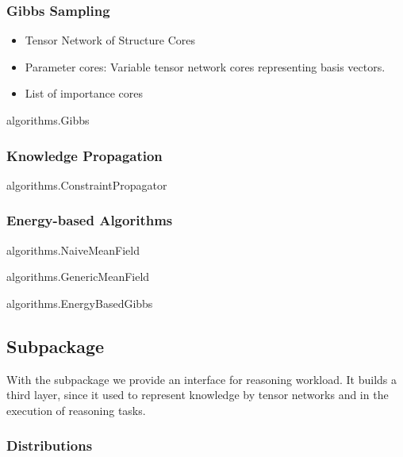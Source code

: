 \subsubsection{Gibbs Sampling}

\begin{itemize}
	\item Tensor Network of Structure Cores
	\item Parameter cores: Variable tensor network cores representing basis vectors.
	\item List of importance cores
\end{itemize}

\begin{centeredcode}
	algorithms.Gibbs
\end{centeredcode}


\subsubsection{Knowledge Propagation}

\begin{centeredcode}
	algorithms.ConstraintPropagator
\end{centeredcode}


\subsubsection{Energy-based Algorithms}

\begin{centeredcode}
	algorithms.NaiveMeanField
\end{centeredcode}

\begin{centeredcode}
	algorithms.GenericMeanField
\end{centeredcode}

\begin{centeredcode}
	algorithms.EnergyBasedGibbs
\end{centeredcode}


\subsection{Subpackage \spknowledge}

With the \spknowledge subpackage we provide an interface for reasoning workload.
It builds a third layer, since it used \spencoding to represent knowledge by tensor networks and \spalgorithms in the execution of reasoning tasks.

\subsubsection{Distributions}



